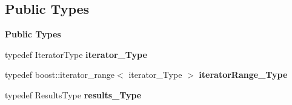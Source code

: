 \subsection*{Public Types}
\begin{Indent}\textbf{ Public Types}\par
\begin{DoxyCompactItemize}
\item 
\mbox{\label{classLifeV_1_1ParserSpiritGrammar_aaa28e2ed8f68d686da1e0bcc5834ed3b}} 
typedef Iterator\+Type {\bfseries iterator\+\_\+\+Type}
\item 
\mbox{\label{classLifeV_1_1ParserSpiritGrammar_a8aca47ceac2876986dbc2ff9ee4d2edd}} 
typedef boost\+::iterator\+\_\+range$<$ iterator\+\_\+\+Type $>$ {\bfseries iterator\+Range\+\_\+\+Type}
\item 
\mbox{\label{classLifeV_1_1ParserSpiritGrammar_a98dabec1a4a9a743a1d3b35e994cec7c}} 
typedef Results\+Type {\bfseries results\+\_\+\+Type}
\end{DoxyCompactItemize}
\end{Indent}
